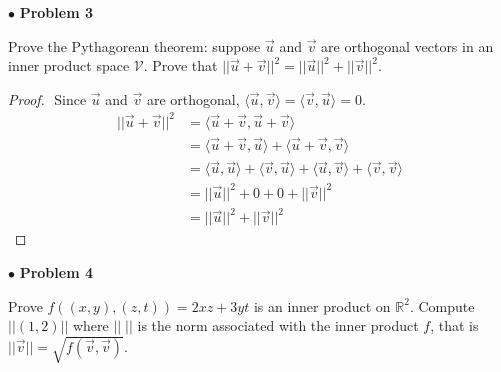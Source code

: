 \documentclass{article}
\begin{document}
\newpage
$ \bullet$ \textbf{Problem 3}
\medskip

\begin{itshape}
Prove the Pythagorean theorem: suppose $\vec{u}$ and $\vec{v}$ are orthogonal vectors in an inner product space $\mathcal{V}$. Prove that $|| \vec{u} + \vec{v} ||^2 = || \vec{u} ||^2 +||\vec{v}||^2$.
\end{itshape}
\medskip

\begin{proof}
$ $\newline
Since $\vec{u}$ and $\vec{v}$ are orthogonal, $\langle \vec{u}, \vec{v} \rangle = \langle \vec{v}, \vec{u} \rangle =0$.
\begin{align*}
|| \vec{u} + \vec{v} ||^2 &= \langle  \vec{u} + \vec{v}, \vec{u} + \vec{v} \rangle \\
&= \langle \vec{u} + \vec{v}, \vec{u} \rangle + \langle \vec{u} + \vec{v}, \vec{v} \rangle \\
&= \langle \vec{u} ,\vec{u} \rangle + \langle \vec{v}, \vec{u} \rangle + \langle \vec{u}, \vec{v} \rangle + \langle \vec{v}, \vec{v} \rangle \\
&= || \vec{u} ||^2 +0 + 0 + || \vec{v}||^2 \\
&= ||\vec{u}||^2+ ||\vec{v}||^2
\end{align*}
\end{proof}

\newpage
$ \bullet$ \textbf{Problem 4}
\medskip

\begin{itshape}
Prove $f((x,y), (z,t)) = 2xz+3yt$ is an inner product on $\mathbb{R}^2$. Compute $||(1,2)||$ where $|| \; ||$ is the norm associated with the inner product $f$, that is $||\vec{v}|| = \sqrt{f(\vec{v},\vec{v})}$.
\end{itshape}
\medskip
\end{document}
